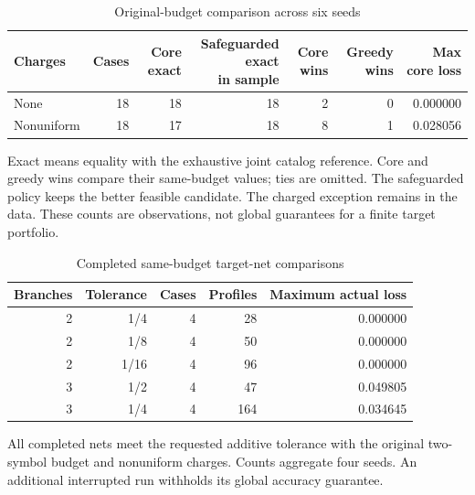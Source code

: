 \begin{table}[p]\centering\small
\caption{Original-budget comparison across six seeds}\label{tab:r45-comparison}
\begin{tabular}{lrrrrrr}\toprule
Charges & Cases & Core exact & \shortstack{Safeguarded exact\\in sample} & Core wins & Greedy wins & Max core loss \\
\midrule
None & 18 & 18 & 18 & 2 & 0 & 0.000000 \\
Nonuniform & 18 & 17 & 18 & 8 & 1 & 0.028056 \\
\bottomrule\end{tabular}
\par\smallskip\begin{minipage}{.98\textwidth}\footnotesize Exact means equality with the exhaustive joint catalog reference. Core and greedy wins compare their same-budget values; ties are omitted. The safeguarded policy keeps the better feasible candidate. The charged exception remains in the data. These counts are observations, not global guarantees for a finite target portfolio.\end{minipage}
\end{table}
\begin{table}[p]\centering\small
\caption{Completed same-budget target-net comparisons}\label{tab:r45-net}
\begin{tabular}{rrrrr}\toprule
Branches & Tolerance & Cases & Profiles & Maximum actual loss \\
\midrule
2 & 1/4 & 4 & 28 & 0.000000 \\
2 & 1/8 & 4 & 50 & 0.000000 \\
2 & 1/16 & 4 & 96 & 0.000000 \\
3 & 1/2 & 4 & 47 & 0.049805 \\
3 & 1/4 & 4 & 164 & 0.034645 \\
\bottomrule\end{tabular}
\par\smallskip\begin{minipage}{.98\textwidth}\footnotesize All completed nets meet the requested additive tolerance with the original two-symbol budget and nonuniform charges. Counts aggregate four seeds. An additional interrupted run withholds its global accuracy guarantee.\end{minipage}
\end{table}
